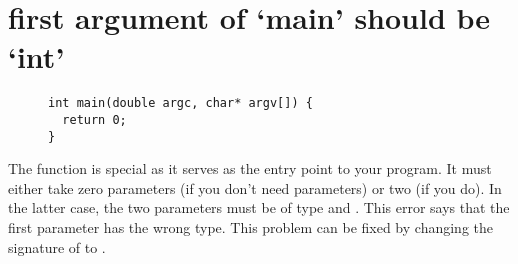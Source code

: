 \section{first argument of `main' should be `int'}\label{sec:main-first-arg}

\begin{figure}[htb]
\begin{lstlisting}
int main(double argc, char* argv[]) {
  return 0;
}
\end{lstlisting}
\label{ex:main-first-arg}
\end{figure}

The  function is special as it serves as the entry point to your program.
It must either take zero parameters (if you don't need parameters) or two (if you do).
In the latter case, the two parameters must be of type  and .
This error says that the first parameter has the wrong type.
This problem can be fixed by changing the signature of  to .
\newpage